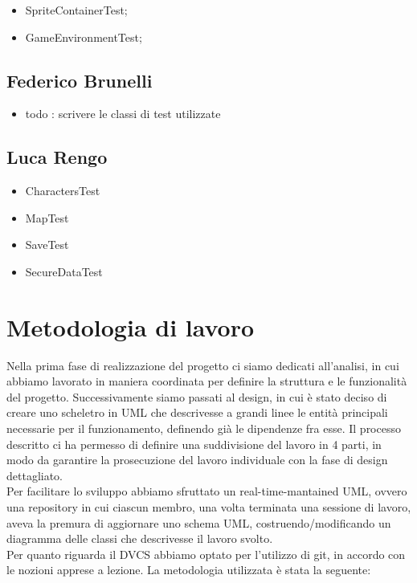 \begin{itemize}
    \item SpriteContainerTest;
	\item GameEnvironmentTest;
\end{itemize}

\subsection*{Federico Brunelli}

\begin{itemize}
	\item todo : scrivere le classi di test utilizzate
\end{itemize}

\subsection*{Luca Rengo}

\begin{itemize}
	\item \textsf{\small CharactersTest}
	\item \textsf{\small MapTest}
	\item \textsf{\small SaveTest}
	\item \textsf{\small SecureDataTest}
\end{itemize}



\section{Metodologia di lavoro}

Nella prima fase di realizzazione del progetto ci siamo dedicati all'analisi, in cui abbiamo lavorato in maniera coordinata per definire la struttura e le funzionalità del progetto.
Successivamente siamo passati al design, in cui è stato deciso di creare uno scheletro in UML che descrivesse a grandi linee le entità principali necessarie per il funzionamento, definendo già le dipendenze fra esse. Il processo descritto ci ha permesso di definire una suddivisione del lavoro in 4 parti, in modo da garantire la prosecuzione del lavoro individuale con la fase di design dettagliato. \\
Per facilitare lo sviluppo abbiamo sfruttato un real-time-mantained UML, ovvero una repository in cui ciascun membro, una volta terminata una sessione di lavoro, aveva la premura di aggiornare uno schema UML, costruendo/modificando un diagramma delle classi che descrivesse il lavoro svolto. \\
Per quanto riguarda il DVCS abbiamo optato per l'utilizzo di git, in accordo con le nozioni apprese a lezione. La metodologia utilizzata è stata la seguente:

